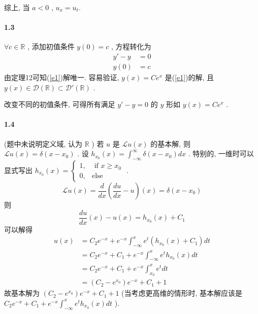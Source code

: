 \documentclass[a4paper, UTF8]{ctexart}				%
\begin{document}
        综上, 当 $a < 0$ , $u_x = u_t$.
    \paragraph{1.3}\quad 
         $\forall c \in \mathbb{R}$ , 添加初值条件 $y(0) = c$ , 方程转化为
         \begin{equation}\label{e1}
             \begin{split}
                 y' - y & = 0\\
                 y(0) & = c
             \end{split}
         \end{equation}
         由定理12可知(\ref{e1})解唯一. 容易验证, $y(x) = C e^x$ 是(\ref{e1})的解, 且 $y(x) \in \mathcal{D}(\mathbb{R}) \subset \mathcal{D}'(\mathbb{R})$ .

         改变不同的初值条件, 可得所有满足 $y' -y = 0$ 的 $y$ 形如 $y(x) = C e^x$ .
    \paragraph{1.4}\quad 
        (题中未说明定义域, 认为 $\mathbb{R}$ ) 若 $u$ 是 $\mathcal{L}u(x)$ 的基本解, 则 $\mathcal{L}u(x) = \delta(x-x_0)$ . 设 
        $h_{x_0}(x) = \int^{\infty}_{-\infty} \delta(x-x_0)dx $ . 特别的, 一维时可以显式写出
        $
            h_{x_0}(x) =
            \begin{cases}
                1, &\text{ if }x \ge x_0\\
                0, &\text{else}
            \end{cases}
        $ . 
        \[
            \mathcal{L}u(x) = \frac{d}{dx}(\frac{du}{dx} - u)(x) = \delta(x-x_0)
        \]
        则 
        \[
            \frac{du}{dx}(x) - u(x)= h_{x_0}(x) + C_1
        \]
        可以解得 
        \[
            \begin{split}
                u(x) 
                & = C_2 e^{-x} +  e^{-x} \int^{x}_{-\infty} e^t(h_{x_0}(x) + C_1)dt\\
                & = C_2 e^{-x} + C_1 + e^{-x} \int^{x}_{-\infty} e^t h_{x_0}(x)dt\\
                & = C_2 e^{-x} + C_1 + e^{-x} \int^{x}_{x_0} e^t dt\\
                & = (C_2 - e^{x_0}) e^{-x} + C_1 + 1
            \end{split}
        \]
        故基本解为 $(C_2 - e^{x_0}) e^{-x} + C_1 + 1$ (当考虑更高维的情形时, 基本解应该是 $C_2 e^{-x} + C_1 + e^{-x} \int^{x}_{-\infty} e^t h_{x_0}(x)dt$ ).
\end{document}
